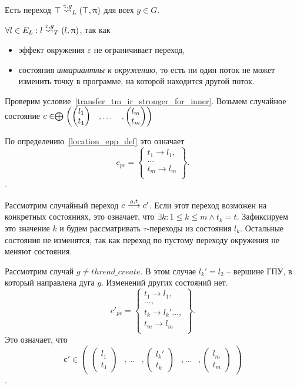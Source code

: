 Есть переход $\top \stackrel{\uptau, g}{\leadsto}_L (\top, \uppi)$ для всех $g\in G$.

$\forall l \in E_L: l \stackrel{\upvarepsilon, g}{\leadsto}_T (l, \uppi)$, так как 
\begin{itemize}
\item эффект окружения $\varepsilon$ не ограничивает переход,
\item состояния {\em инвариантны к окружению}, то есть ни один поток не может изменить точку в программе, на которой находится другой поток.
\end{itemize}

Проверим условие~\ref{transfer_tm_ir_stronger_for_inner}.
Возьмем случайное состояние $c \in \mathrel{\bigoplus}
\begin{pmatrix}
\begin{pmatrix}
l_1 \\
t_1 
\end{pmatrix}& ,
\dots& ,
\begin{pmatrix}
l_m \\
t_m 
\end{pmatrix}
\end{pmatrix}$

По определению~\ref{location_epp_def} это означает 
$$ c_{pc} = 
\left\lbrace
\begin{array}{c}
t_1 \to l_1,\\
\dots\\
t_m \to l_m\\
\end{array}
\right\rbrace.$$.

Рассмотрим случайный переход $c \stackrel{g,t}{\longrightarrow} c'$. Если этот переход возможен на конкретных состояниях, это означает, что $\exists k : 1 \le k \le m \land t_k = t$. Зафиксируем это значение $k$ и будем рассматривать $\tau$-переходы из состояния $l_k$. Остальные состояния не изменятся, так как переход по пустому переходу окружения не меняют состояния.

Рассмотрим случай $g \neq thread\_create$. В этом случае $l_k' = l_2$ -- вершине ГПУ, в который направлена дуга $g$. Изменений других состояний нет. $$ c'_{pc} = 
\left\lbrace
\begin{array}{c}
t_1 \to l_1,\\
\dots,\\
t_k \to l_k'
\dots,\\
t_m \to l_m\\
\end{array}
\right\rbrace.$$ Это означает, что $$с' \in \begin{pmatrix}
\begin{pmatrix}
l_1 \\
t_1 
\end{pmatrix}& ,
\dots& ,
\begin{pmatrix}
l_k' \\
t_k 
\end{pmatrix}& ,
\dots& ,
\begin{pmatrix}
l_m \\
t_m 
\end{pmatrix}
\end{pmatrix}$$.

